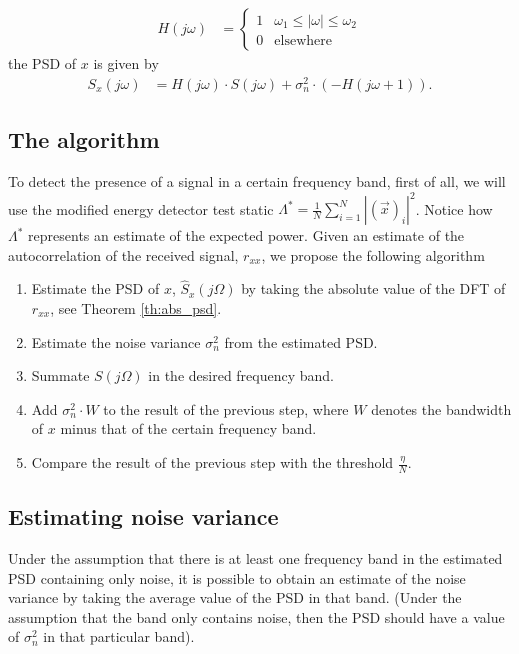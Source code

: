 \begin{align*}
H(j\omega) &= \begin{cases}1 &\text{$\omega_1 \leq |\omega| \leq \omega_2$} \\
0 & \text{elsewhere} \end{cases} 
\end{align*}
the PSD of $x$ is given by
\begin{align}
S_x(j\omega) &= H(j\omega) \cdot S(j\omega) + \sigma_n^2 \cdot \left(-H(j\omega+1) \right).
\end{align}

\subsection{The algorithm}

To detect the presence of a signal in a certain frequency band, first of all, we will use the modified energy detector test static $\Lambda^* = \frac{1}{N}\sum_{i=1}^N \left|(\vec{x})_i\right|^2$. Notice how $\Lambda^*$ represents an estimate of the expected power.  Given an estimate of the autocorrelation of the received signal, $r_{xx}$,  we propose the following algorithm

\begin{enumerate}   
    \item Estimate the PSD of $x$, $\hat{S}_x(j\Omega)$  by taking the absolute value of the DFT of $r_{xx}$, see Theorem \ref{th:abs_psd}.
    \item Estimate the noise variance $\sigma_n^2$ from the estimated PSD.
    \item Summate $S(j\Omega)$ in the desired frequency band.
    \item Add $\sigma_n^2 \cdot W$ to the result of the previous step, where $W$ denotes the bandwidth of
    $x$ minus that of the certain frequency band. 
    \item Compare the result of the previous step with the threshold $\frac{\eta}{N}$.
\end{enumerate}

\subsection{Estimating noise variance}
Under the assumption that there is at least one frequency band in the estimated PSD containing only noise, it is possible to obtain an estimate of the noise variance
by taking the average value of the PSD in that band. (Under the assumption that the band only contains noise, then the PSD should have a value of $\sigma_n^2$ in that particular band).


